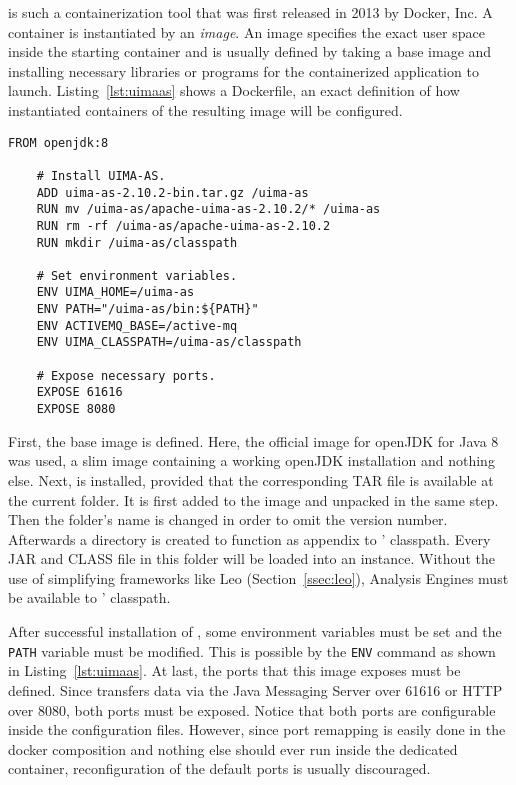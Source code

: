 \docker{} is such a containerization tool that was first released in 2013 by Docker, Inc. A \docker{} container is instantiated by an \emph{image}. An image specifies the exact user space inside the starting container and is usually defined by taking a base image and installing necessary libraries or programs for the containerized application to launch. Listing~\ref{lst:uimaas} shows a Dockerfile, an exact definition of how instantiated containers of the resulting image will be configured.
\begin{lstlisting}[caption={An example Dockerfile for an UIMA-AS image.},label=lst:uimaas,morekeywords={FROM,ADD,RUN,ENV,EXPOSE}]
	FROM openjdk:8
	
	# Install UIMA-AS.
	ADD uima-as-2.10.2-bin.tar.gz /uima-as
	RUN mv /uima-as/apache-uima-as-2.10.2/* /uima-as
	RUN rm -rf /uima-as/apache-uima-as-2.10.2
	RUN mkdir /uima-as/classpath
	
	# Set environment variables.
	ENV UIMA_HOME=/uima-as
	ENV PATH="/uima-as/bin:${PATH}"
	ENV ACTIVEMQ_BASE=/active-mq
	ENV UIMA_CLASSPATH=/uima-as/classpath
	
	# Expose necessary ports.
	EXPOSE 61616
	EXPOSE 8080
\end{lstlisting}
First, the base image is defined. Here, the official image for openJDK for Java 8 was used, a slim image containing a working openJDK installation and nothing else. Next, \uimaas{} is installed, provided that the corresponding TAR file is available at the current folder. It is first added to the image and unpacked in the same step. Then the folder's name is changed in order to omit the version number. Afterwards a directory is created to function as appendix to \uimaas{}' classpath. Every JAR and CLASS file in this folder will be loaded into an \uimaas{} instance. Without the use of simplifying frameworks like Leo (Section~\ref{ssec:leo}), Analysis Engines must be available to \uimaas{}' classpath.

After successful installation of \uimaas{}, some environment variables must be set and the \lstinline|PATH| variable must be modified. This is possible by the \lstinline[morekeywords={ENV}]|ENV| command as shown in Listing~\ref{lst:uimaas}. At last, the ports that this image exposes must be defined. Since \uimaas{} transfers data via the Java Messaging Server over 61616 or HTTP over 8080, both ports must be exposed. Notice that both ports are configurable inside the \uimaas{} configuration files. However, since port remapping is easily done in the docker composition and nothing else should ever run inside the dedicated \uimaas{} container, reconfiguration of the default ports is usually discouraged.

